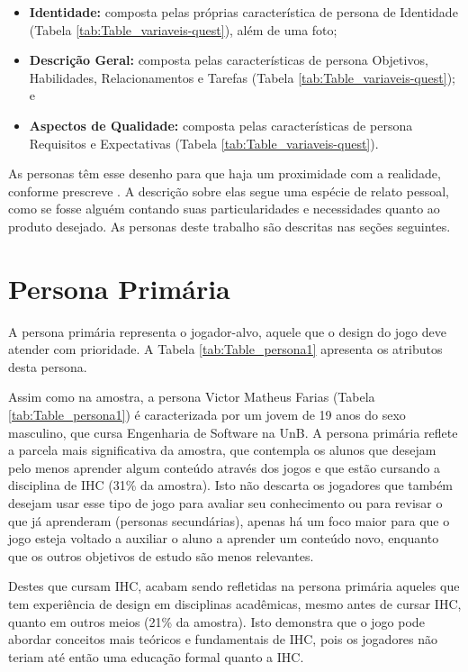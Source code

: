 \begin{itemize}
    \item \textbf{Identidade:} composta pelas próprias característica de persona de Identidade (Tabela \ref{tab:Table_variaveis-quest}), além de uma foto;
    
    \item \textbf{Descrição Geral:} composta pelas características de persona Objetivos, Habilidades, Relacionamentos e Tarefas (Tabela \ref{tab:Table_variaveis-quest}); e 
    
    \item \textbf{Aspectos de Qualidade:} composta pelas características de persona Requisitos e Expectativas (Tabela \ref{tab:Table_variaveis-quest}).
\end{itemize}

As personas têm esse desenho para que haja um proximidade com a realidade, conforme prescreve . A descrição sobre elas segue uma espécie de relato pessoal, como se fosse alguém contando suas particularidades e necessidades quanto ao produto desejado. As personas deste trabalho são descritas nas seções seguintes.


\section{Persona Primária}
\label{sec:p1}

A persona primária representa o jogador-alvo, aquele que o design do jogo deve atender com prioridade. A Tabela \ref{tab:Table_persona1} apresenta os atributos desta persona.



Assim como na amostra, a persona Victor Matheus Farias (Tabela \ref{tab:Table_persona1}) é caracterizada por um jovem de 19 anos do sexo masculino, que cursa Engenharia de Software na UnB. A persona primária reflete a parcela mais significativa da amostra, que contempla os alunos que desejam pelo menos aprender algum conteúdo através dos jogos e que estão cursando a disciplina de IHC (31\% da amostra). Isto não descarta os jogadores que também desejam usar esse tipo de jogo para avaliar seu conhecimento ou para revisar o que já aprenderam (personas secundárias), apenas há um foco maior para que o jogo esteja voltado a auxiliar o aluno a aprender um conteúdo novo, enquanto que os outros objetivos de estudo são menos relevantes. 

Destes que cursam IHC, acabam sendo refletidas na persona primária aqueles que tem experiência de design em disciplinas acadêmicas, mesmo antes de cursar IHC, quanto em outros meios (21\% da amostra). Isto demonstra que o jogo pode abordar conceitos mais teóricos e fundamentais de IHC, pois os jogadores não teriam até então uma educação formal quanto a IHC.

